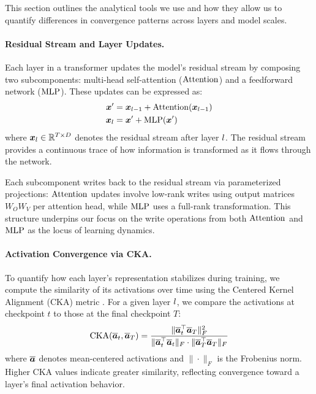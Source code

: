 This section outlines the analytical tools we use and how they allow us to quantify differences in convergence patterns across layers and model scales.

\paragraph{Residual Stream and Layer Updates.}
Each layer in a transformer updates the model's residual stream by composing two subcomponents: multi-head self-attention ($\mathrm{Attention}$) and a feedforward network ($\mathrm{MLP}$). These updates can be expressed as:
\begin{align}
    \boldsymbol{x}' &= \boldsymbol{x}_{l-1} + \mathrm{Attention}(\boldsymbol{x}_{l-1}) \\
    \boldsymbol{x}_{l} &= \boldsymbol{x}' + \mathrm{MLP}(\boldsymbol{x}')
\end{align}
where $\boldsymbol{x}_{l} \in \mathbb{R}^{T \times D}$ denotes the residual stream after layer $l$. The residual stream provides a continuous trace of how information is transformed as it flows through the network.

Each subcomponent writes back to the residual stream via parameterized projections: $\mathrm{Attention}$ updates involve low-rank writes using output matrices $W_O W_V$ per attention head, while $\mathrm{MLP}$ uses a full-rank transformation. This structure underpins our focus on the write operations from both $\mathrm{Attention}$ and $\mathrm{MLP}$ as the locus of learning dynamics.

\paragraph{Activation Convergence via CKA.}
To quantify how each layer's representation stabilizes during training, we compute the similarity of its activations over time using the Centered Kernel Alignment (CKA) metric \citep{kornblith2019cka}. For a given layer $l$, we compare the activations at checkpoint $t$ to those at the final checkpoint $T$:
\begin{align}
    \mathrm{CKA}(\overline{\boldsymbol{a}}_{t}, \overline{\boldsymbol{a}}_{T}) = 
    \frac{\|\overline{\boldsymbol{a}}_{t}^{\top} \overline{\boldsymbol{a}}_{T}\|_F^2}
         {\|\overline{\boldsymbol{a}}_{t}^{\top} \overline{\boldsymbol{a}}_{t}\|_F \cdot \|\overline{\boldsymbol{a}}_{T}^{\top} \overline{\boldsymbol{a}}_{T}\|_F}
\end{align}
where $\overline{\boldsymbol{a}}$ denotes mean-centered activations and $\|\cdot\|_F$ is the Frobenius norm. Higher CKA values indicate greater similarity, reflecting convergence toward a layer's final activation behavior.

